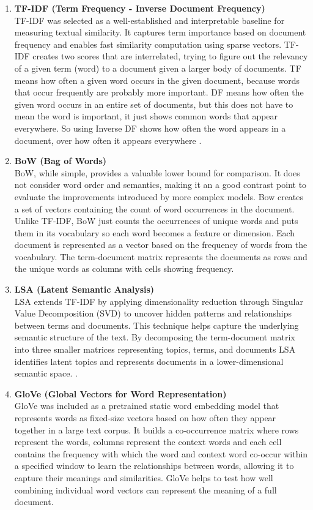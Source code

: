 \documentclass[\myFontSize,a4paper,oneside,english,hidelinks]{article}
\begin{document}
\begin{enumerate}
\item \textbf{TF-IDF (Term Frequency - Inverse Document Frequency)}\\
TF-IDF was selected as a well-established and interpretable baseline for measuring textual similarity. It captures term importance based on document frequency and enables fast similarity computation using sparse vectors.
TF-IDF creates two scores that are interrelated, trying to figure out the relevancy of a given term (word) to a document given a larger body of documents. TF means how often a given word occurs in the given document, because words that occur frequently are probably more important. DF means how often the given word occurs in an entire set of documents, but this does not have to mean the word is important, it just shows common words that appear everywhere. So using Inverse DF shows how often the word appears in a document, over how often it appears everywhere \cite{pub.1022525812}.


\item \textbf{BoW (Bag of Words)}\\
BoW, while simple, provides a valuable lower bound for comparison. It does not consider word order and semantics, making it an a good contrast point to evaluate the improvements introduced by more complex models.
Bow creates a set of vectors containing the count of word occurrences in the document. Unlike TF-IDF, BoW just counts the occurrences of unique words and puts them in its vocabulary so each word becomes a feature or dimension. Each document is represented as a vector based on the frequency of words from the vocabulary. The term-document matrix represents the documents as rows and the unique words as columns with cells showing frequency.
 

\item \textbf{LSA (Latent Semantic Analysis)}\\
LSA extends TF-IDF by applying dimensionality reduction through Singular Value Decomposition (SVD) to uncover hidden patterns and relationships between terms and documents. This technique helps capture the underlying semantic structure of the text. By decomposing the term-document matrix into three smaller matrices representing topics, terms, and documents LSA identifies latent topics and represents documents in a lower-dimensional semantic space. \cite{Bergamaschi2015247}.


\item \textbf{GloVe (Global Vectors for Word Representation)}\\
GloVe was included as a pretrained static word embedding model that represents words as fixed-size vectors based on how often they appear together in a large text corpus. It builds a co-occurrence matrix where rows represent the words, columns represent the context words and each cell contains the frequency with which the word and context word co-occur within a specified window to learn the relationships between words, allowing it to capture their meanings and similarities. GloVe helps to test how well combining individual word vectors can represent the meaning of a full document.



\end{enumerate}
\end{document}
